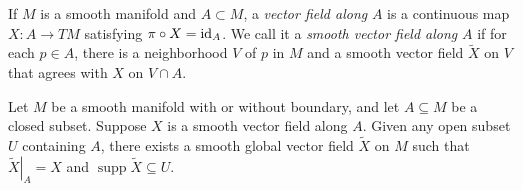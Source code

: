 \begin{definition}
    If $M$ is a smooth manifold and $A \subset M$, a \textit{vector field along} $A$ is a continuous map $X:A \to TM$ satisfying $\pi \circ X = \mathrm{id}_A$.
    We call it a \textit{smooth vector field along} $A$ if for each $p \in A$, there is a neighborhood $V$ of $p$ in $M$ and a smooth vector field $\widetilde{X}$ on $V$ that agrees with $X$ on $V \cap A$. 
\end{definition}
\begin{lemma}
    Let $M$ be a smooth manifold with or without boundary, and let $A \subseteq M$ be a closed subset. Suppose $X$ is a smooth vector field along $A$. Given any open subset $U$ containing $A$, there exists a smooth global vector field $\tilde{X}$ on $M$ such that $\left.\widetilde{X}\right|_A=X$ and $\operatorname{supp} \widetilde{X} \subseteq U$.
\end{lemma}
